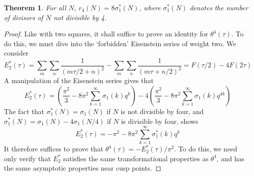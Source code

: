 \documentclass{article}
\theoremstyle{plain}
\newtheorem{theorem}{Theorem}
\theoremstyle{remark}
\theoremstyle{definition}
\begin{document}
\begin{theorem}
    For all $N$, $r_4(N) = 8 \sigma_1^*(N)$, where $\sigma_1^*(N)$ denotes the number of divisors of $N$ {\it not} divisible by 4.
\end{theorem}
\begin{proof}
    Like with two squares, it shall suffice to prove an identity for $\theta^4(\tau)$. To do this, we must dive into the `forbidden' Eisenstein series of weight two. We consider
%
\[ E_2^*(\tau) = \sum_m \sum_n \frac{1}{(m\tau/2 + n)^2} - \sum_m \sum_n \frac{1}{(m \tau + n/2)^2} = F(\tau/2) - 4F(2\tau) \]
%
A manipulation of the Eisenstein series gives that
%
\[ E_2^*(\tau) = \left( \frac{\pi^2}{3} - 8 \pi^2 \sum_{k = 1}^\infty \sigma_1(k) q^k \right) - 4 \left( \frac{\pi^2}{3} - 8 \pi^2 \sum_{k = 1}^\infty \sigma_1(k) q^{4k} \right) \]
%
The fact that $\sigma_1^*(N) = \sigma_1(N)$ if $N$ is not divisible by four, and $\sigma_1^*(N) = \sigma_1(N) - 4 \sigma_1(N/4)$ if $N$ is divisible by four, shows
%
\[ E_2^*(\tau) = - \pi^2 - 8 \pi^2 \sum_{k = 1}^\infty \sigma_1^*(k) q^k \]
%
It therefore suffices to prove that $\theta^4(\tau) = -E_2^*(\tau)/\pi^2$. To do this, we need only verify that $E_2^*$ satisfies the same transformational properties as $\theta^4$, and has the same asymptotic properties near cusp points.


\end{proof}
\end{document}
